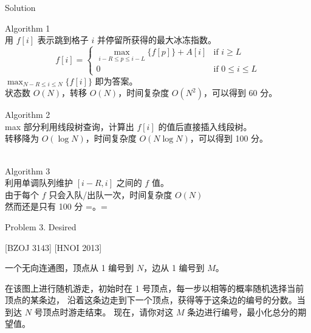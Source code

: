 \documentclass[UTF8]{beamer}
\begin{document}
\begin{frame}{Solution}

\begin{itemize}
     {\item Algorithm 1 \\
        用 $f[i]$ 表示跳到格子 $i$ 并停留所获得的最大冰冻指数。
        \pause
        \begin{equation*}
            f[i] =
            \begin{cases}
                \max_{i-R \leq p \leq i-L} \{ f[p] \} + A[i] &\mbox{if $i \geq L$} \\
                0   &\mbox{if $0 \leq i \le L$}
            \end{cases}
        \end{equation*}
        \pause
        $\max_{N-R \leq i \leq N} \{ f[i] \}$ 即为答案。 \\
        \pause
        状态数 $O(N)$，转移 $O(N)$，时间复杂度 $O(N^2)$，可以得到 60 分。}
     { {\item Algorithm 2 \\
        max 部分利用线段树查询，计算出 $f[i]$ 的值后直接插入线段树。 \\
        转移降为 $O(\log N)$，时间复杂度 $O(N \log N)$，可以得到 100 分。 \\　}}
     {\item Algorithm 3 \\
        利用单调队列维护 $[i-R, i]$ 之间的 $f$ 值。 \\
        由于每个 $f$ 只会入队/出队一次，时间复杂度 $O(N)$ \\然而还是只有 100 分 =。=}
\end{itemize}

\end{frame}


\begin{frame}{Problem 3. Desired}

[BZOJ 3143] [HNOI 2013]

一个无向连通图，顶点从 1 编号到 $N$，边从 1 编号到 $M$。

在该图上进行随机游走，初始时在 1 号顶点，每一步以相等的概率随机选择当前顶点的某条边，
沿着这条边走到下一个顶点，获得等于这条边的编号的分数。当到达 $N$ 号顶点时游走结束。
现在，请你对这 $M$ 条边进行编号，最小化总分的期望值。

\end{frame}
\end{document}
